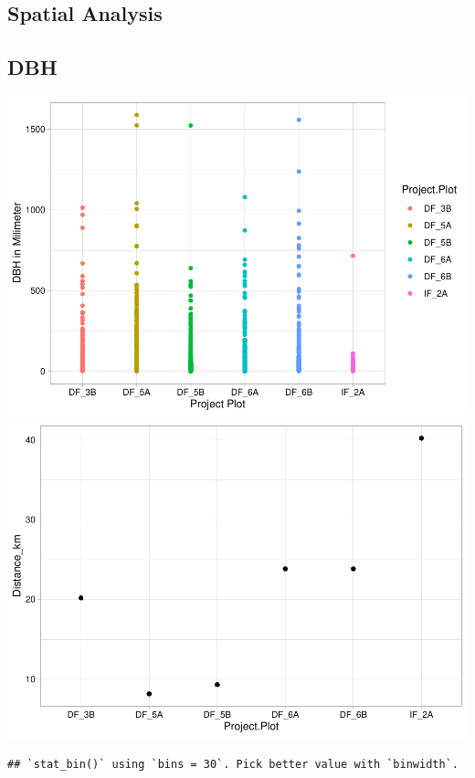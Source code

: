 \documentclass[
  12pt,
]{article}
\begin{document}
\newpage

\hypertarget{spatial-analysis}{%
\subsection{Spatial Analysis}\label{spatial-analysis}}

\hypertarget{dbh}{%
\subsection{DBH}\label{dbh}}

\includegraphics{GoldenGriffithsKnierMalinowski_ENV872_Project_files/figure-latex/DBH graphs-1.pdf}
\includegraphics{GoldenGriffithsKnierMalinowski_ENV872_Project_files/figure-latex/DBH graphs-2.pdf}

\begin{verbatim}
## `stat_bin()` using `bins = 30`. Pick better value with `binwidth`.
\end{verbatim}
\end{document}
